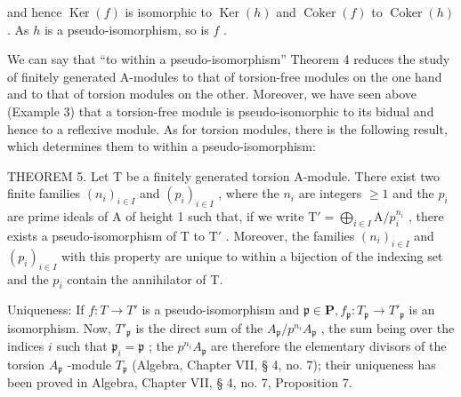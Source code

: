 and hence \(\operatorname{Ker}(f)\) is isomorphic to \(\operatorname{Ker}(h)\) and \(\operatorname{Coker}(f)\) to \(\operatorname{Coker}(h)\) . As \(h\) is a pseudo-isomorphism, so is \(f\) .

We can say that ``to within a pseudo-isomorphism'' Theorem 4 reduces the study of finitely generated A-modules to that of torsion-free modules on the one hand and to that of torsion modules on the other. Moreover, we have seen above (Example 3) that a torsion-free module is pseudo-isomorphic to its bidual and hence to a reflexive module. As for torsion modules, there is the following result, which determines them to within a pseudo-isomorphism:

THEOREM 5. Let T be a finitely generated torsion A-module. There exist two finite families \((n_i)_{i\in I}\) and \((p_i)_{i\in I}\) , where the \(n_i\) are integers \(\geqslant 1\) and the \(p_i\) are prime ideals of A of height 1 such that, if we write \(\mathrm{T}' = \bigoplus_{i\in I} \mathrm{A} / p_i^{n_i}\) , there exists a pseudo-isomorphism of T to \(\mathrm{T}'\) . Moreover, the families \((n_i)_{i\in I}\) and \((p_i)_{i\in I}\) with this property are unique to within a bijection of the indexing set and the \(p_i\) contain the annihilator of T.

Uniqueness: If \(f\colon T\to T'\) is a pseudo-isomorphism and \(\mathfrak{p}\in\mathbf{P},f_{\mathfrak{p}}\colon T_{\mathfrak{p}}\to T'_{\mathfrak{p}}\) is an isomorphism. Now, \(T'_{\mathfrak{p}}\) is the direct sum of the \(A_{\mathfrak{p}}/p^{n_{i}}A_{\mathfrak{p}}\) , the sum being over the indices \(i\) such that \(\mathfrak{p}_{i}=\mathfrak{p}\) ; the \(p^{n_{i}}A_{\mathfrak{p}}\) are therefore the elementary divisors of the torsion \(A_{\mathfrak{p}}\) -module \(T_{\mathfrak{p}}\) (Algebra, Chapter VII, § 4, no. 7); their uniqueness has been proved in Algebra, Chapter VII, § 4, no. 7, Proposition 7.

